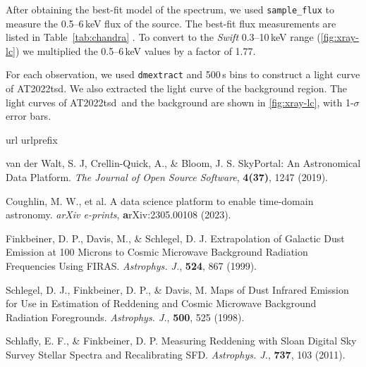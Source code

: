 \documentclass{nature_plusfigure}
\newcommand{\apj}{{Astrophys. J.}}
\newcommand{\at}{AT2022tsd}
\begin{document}
\begin{methods}
After obtaining the best-fit model of the spectrum, we used \texttt{sample\_flux} to measure the 0.5--6\,keV flux of the source. The best-fit flux measurements are listed in Table~\ref{tab:chandra} . To convert to the \emph{Swift} 0.3--10\,keV range (\ref{fig:xray-lc}) we multiplied the 0.5--6\,keV values by a factor of 1.77.

For each observation, we used \texttt{dmextract} and 500\,s bins to construct a light curve of \at. We also extracted the light curve of the background region. The light curves of \at\ and the background are shown in \ref{fig:xray-lc}, with 1-$\sigma$ error bars.

\vspace{1in}
%
%

\begin{thebibliography}{10}
\expandafter\ifx\csname url\endcsname\relax
  \def\url#1{\texttt{#1}}\fi
\expandafter\ifx\csname urlprefix\endcsname\relax\def\urlprefix{URL }\fi
\providecommand{\bibinfo}[2]{#2}
\providecommand{\eprint}[2][]{\url{#2}}
\makeatletter
\addtocounter{\@listctr}{74}
\makeatother



  van der Walt, S. J, Crellin-Quick, A., \& Bloom, J. S. SkyPortal: An Astronomical Data Platform. \emph{The Journal of Open Source Software}, \textbf{4(37)}, 1247 (2019). 

  Coughlin, M. W., et al. A data science platform to enable time-domain astronomy. \emph{arXiv e-prints}, \textbf arXiv:2305.00108 (2023). 



  Finkbeiner, D. P., Davis, M., \& Schlegel, D. J. Extrapolation of Galactic Dust Emission at 100 Microns to Cosmic Microwave Background Radiation Frequencies Using FIRAS. \emph{\apj}, \textbf{524}, 867 (1999). 
 
  Schlegel, D. J., Finkbeiner, D. P., \& Davis, M. Maps of Dust Infrared Emission for Use in Estimation of Reddening and Cosmic Microwave Background Radiation Foregrounds. \emph{\apj}, \textbf{500}, 525 (1998). 

  Schlafly, E. F., \& Finkbeiner, D. P. Measuring Reddening with Sloan Digital Sky Survey Stellar Spectra and Recalibrating SFD. \emph{\apj}, \textbf{737}, 103 (2011). 
 

\end{thebibliography}
\end{methods}
\end{document}
